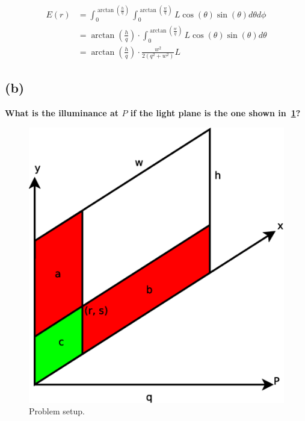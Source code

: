 \documentclass{report}
\begin{document}
\begin{align}
E(r) &= \int_{0}^{\arctan(\frac{h}{q})} \int_{0}^{\arctan(\frac{w}{q})} L\cos(\theta) \sin(\theta) d\theta d\phi \\
     &= \arctan\left(\frac{h}{q}\right) \cdot \int_{0}^{\arctan(\frac{w}{q})} L\cos(\theta) \sin(\theta) d\theta \\
     &= \arctan\left(\frac{h}{q}\right) \cdot \frac{w^2}{2 \left(q^2 + w^2\right)} L
\end{align}



\subsection{(b)}
\textbf{What is the illuminance at $P$ if the light plane is the one shown in~\ref{q2b:setup}?}

\begin{figure}
  \centering
  \includegraphics[width=0.2\linewidth]{q2b_setup.eps}
  \caption[Problem setup]
   {Problem setup.}
  \label{q2b:setup}
\end{figure}
\end{document}
